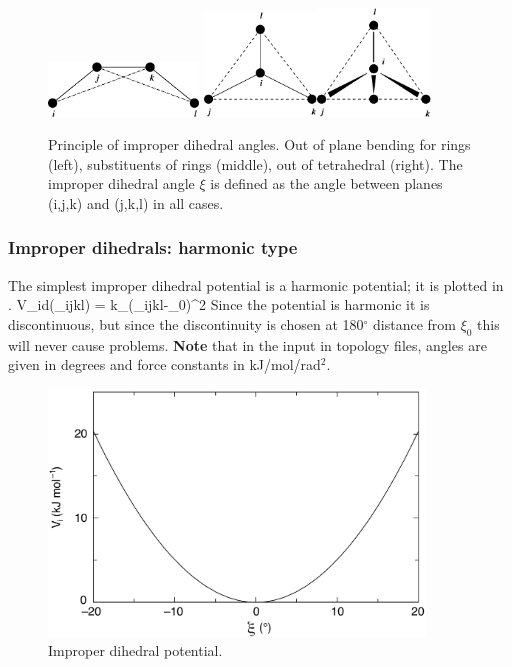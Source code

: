 \begin {figure}
\centerline{\includegraphics[width=4cm]{plots/ring-imp}\hspace{1cm}
\includegraphics[width=3cm]{plots/subst-im}\hspace{1cm}\includegraphics[width=3cm]{plots/tetra-im}}
\caption[Improper dihedral angles.]{Principle of improper
dihedral angles. Out of plane bending for rings (left), substituents
of rings (middle), out of tetrahedral (right). The improper dihedral
angle $\xi$ is defined as the angle between planes (i,j,k) and (j,k,l)
in all cases.}
\label{fig:imp}
\end {figure}

\subsubsection{Improper dihedrals: harmonic type}
\label{subsec:harmonicimproperdihedral}
The simplest improper dihedral potential is a harmonic potential; it is plotted in
.
\beq
V_{id}(\xi_{ijkl}) = \half k_{\xi}(\xi_{ijkl}-\xi_0)^2
\eeq
Since the potential is harmonic it is discontinuous,
but since the discontinuity is chosen at 180$^\circ$ distance from $\xi_0$
this will never cause problems.
{\bf Note} that in the input in topology files, angles are given in degrees and
force constants in kJ/mol/rad$^2$.

\begin{figure}
\centerline{\includegraphics[width=10cm]{plots/f-imps.pdf}}
\caption{Improper dihedral potential.}
\label{fig:imps}
\end{figure}

